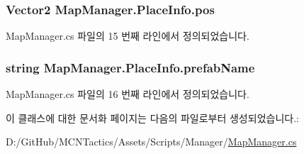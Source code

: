 \subsubsection[{\texorpdfstring{pos}{pos}}]{\setlength{\rightskip}{0pt plus 5cm}Vector2 Map\+Manager.\+Place\+Info.\+pos}\hypertarget{class_map_manager_1_1_place_info_a892976a463c8f25b15b248220f10289e}{}\label{class_map_manager_1_1_place_info_a892976a463c8f25b15b248220f10289e}


Map\+Manager.\+cs 파일의 15 번째 라인에서 정의되었습니다.

\subsubsection[{\texorpdfstring{prefab\+Name}{prefabName}}]{\setlength{\rightskip}{0pt plus 5cm}string Map\+Manager.\+Place\+Info.\+prefab\+Name}\hypertarget{class_map_manager_1_1_place_info_a82ac5b1455ed7b78f7338784ac91fe1b}{}\label{class_map_manager_1_1_place_info_a82ac5b1455ed7b78f7338784ac91fe1b}


Map\+Manager.\+cs 파일의 16 번째 라인에서 정의되었습니다.



이 클래스에 대한 문서화 페이지는 다음의 파일로부터 생성되었습니다.\+:\begin{DoxyCompactItemize}
\item 
D\+:/\+Git\+Hub/\+M\+C\+N\+Tactics/\+Assets/\+Scripts/\+Manager/\hyperlink{_map_manager_8cs}{Map\+Manager.\+cs}\end{DoxyCompactItemize}
